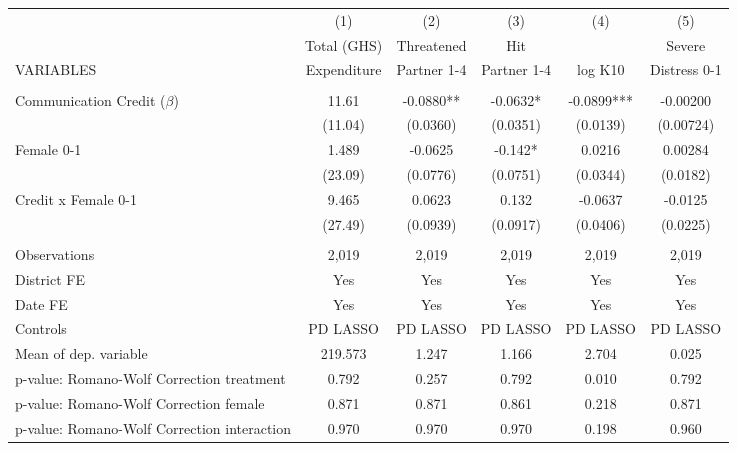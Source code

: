 \begin{tabular}{lccccc} \hline
 & (1) & (2) & (3) & (4) & (5) \\
 & Total (GHS) & Threatened & Hit &  & Severe \\
VARIABLES & Expenditure & Partner 1-4 & Partner 1-4 & log K10 & Distress 0-1 \\ \hline
 &  &  &  &  &  \\
Communication Credit ($\beta$) & 11.61 & -0.0880** & -0.0632* & -0.0899*** & -0.00200 \\
 & (11.04) & (0.0360) & (0.0351) & (0.0139) & (0.00724) \\
Female 0-1 & 1.489 & -0.0625 & -0.142* & 0.0216 & 0.00284 \\
 & (23.09) & (0.0776) & (0.0751) & (0.0344) & (0.0182) \\
Credit x Female 0-1 & 9.465 & 0.0623 & 0.132 & -0.0637 & -0.0125 \\
 & (27.49) & (0.0939) & (0.0917) & (0.0406) & (0.0225) \\
 &  &  &  &  &  \\
Observations & 2,019 & 2,019 & 2,019 & 2,019 & 2,019 \\
District FE & Yes & Yes & Yes & Yes & Yes \\
Date FE & Yes & Yes & Yes & Yes & Yes \\
Controls & PD LASSO & PD LASSO & PD LASSO & PD LASSO & PD LASSO \\
Mean of dep. variable & 219.573 & 1.247 & 1.166 & 2.704 & 0.025 \\
p-value: Romano-Wolf Correction treatment & 0.792 & 0.257 & 0.792 & 0.010 & 0.792 \\
p-value: Romano-Wolf Correction female & 0.871 & 0.871 & 0.861 & 0.218 & 0.871 \\
 p-value: Romano-Wolf Correction interaction & 0.970 & 0.970 & 0.970 & 0.198 & 0.960 \\ \hline
\end{tabular}
